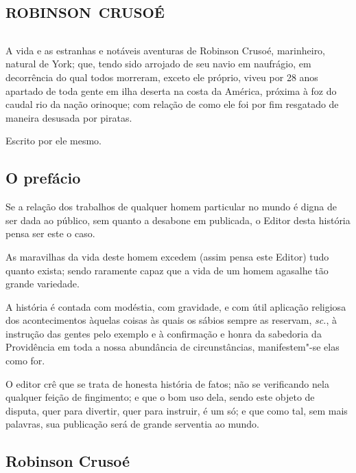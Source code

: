 \part{\textsc{robinson crusoé}}

\chapter*{}
\thispagestyle{empty}


\vfill
A vida e as estranhas e notáveis aventuras de Robinson Crusoé,
marinheiro, natural de York; que, tendo sido arrojado de seu navio em
naufrágio, em decorrência do qual todos morreram, exceto ele próprio,
viveu por 28 anos apartado de toda gente em ilha deserta na costa da
América, próxima à foz do caudal rio da nação orinoque; com relação de
como ele foi por fim resgatado de maneira desusada por piratas.

\hfill{}Escrito por ele mesmo.

\chapter{O prefácio}

Se a relação dos trabalhos de qualquer homem particular no mundo é digna
de ser dada ao público, sem quanto a desabone em publicada, o Editor
desta história pensa ser este o caso.

As maravilhas da vida deste homem excedem (assim pensa este Editor) tudo
quanto exista; sendo raramente capaz que a vida de um homem agasalhe tão
grande variedade.

A história é contada com modéstia, com gravidade, e com útil aplicação
religiosa dos acontecimentos àquelas coisas às quais os sábios sempre as
reservam, \emph{sc.}, à instrução das gentes pelo exemplo e à
confirmação e honra da sabedoria da Providência em toda a nossa
abundância de circunstâncias, manifestem"-se elas como for.

O editor crê que se trata de honesta história de fatos; não se
verificando nela qualquer feição de fingimento; e que o bom uso dela,
sendo este objeto de disputa, quer para divertir, quer para instruir, é
um só; e que como tal, sem mais palavras, sua publicação será de grande
serventia ao mundo.

\asterisc

\chapter{Robinson Crusoé}

